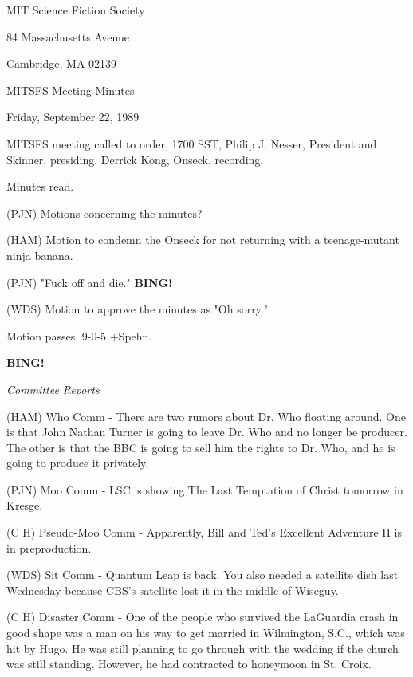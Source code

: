 \documentclass[12pt]{article}
\newcommand{\bing}{{\bf BING!} }
\newcommand{\goto}[1]{\bing \vskip 12pt \centerline{{\em{#1}}}}
\begin{document}
\begin{center}

MIT Science Fiction Society 

84 Massachusetts Avenue

Cambridge, MA 02139

\vspace{12pt}

MITSFS Meeting Minutes 

Friday, September 22, 1989

\end{center}
 
\vspace{18pt}

\setlength{\parskip}{6pt}

\noindent
MITSFS meeting called to order, 1700 SST, Philip J. Nesser, President and Skinner, presiding. Derrick Kong, Onseck, recording.

Minutes read.

(PJN) Motions concerning the minutes?

(HAM) Motion to condemn the Onseck for not returning with a teenage-mutant ninja banana.

(PJN) "Fuck off and die."  \bing

(WDS) Motion to approve the minutes as "Oh sorry."

Motion passes, 9-0-5 +Spehn.

\goto{Committee Reports}

(HAM) Who Comm - There are two rumors about Dr. Who floating around. One is that John Nathan Turner is going to leave Dr. Who and no longer be producer. The other is that the BBC is going to sell him the rights to Dr. Who, and he is going to produce it privately.

(PJN) Moo Comm - LSC is showing The Last Temptation of Christ tomorrow in Kresge.

(C H) Pseudo-Moo Comm - Apparently, Bill and Ted's Excellent Adventure II is in preproduction.

(WDS) Sit Comm - Quantum Leap is back. You also needed a satellite dish last Wednesday because CBS's satellite lost it in the middle of Wiseguy.

(C H) Disaster Comm - One of the people who survived the LaGuardia crash in good shape was a man on his way to get married in Wilmington, S.C., which was hit by Hugo. He was still planning to go through with the wedding if the church was still standing. However, he had contracted to honeymoon in St. Croix.
\end{document}
